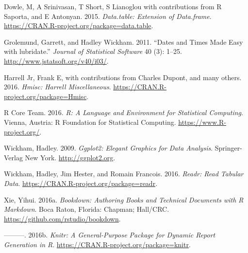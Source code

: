 \documentclass[]{article}
\theoremstyle{definition}
\theoremstyle{definition}
\theoremstyle{definition}
\theoremstyle{remark}
\begin{document}
\hypertarget{refs}{}
\hypertarget{ref-data.table}{}
Dowle, M, A Srinivasan, T Short, S Lianoglou with contributions from R
Saporta, and E Antonyan. 2015. \emph{Data.table: Extension of
Data.frame}. \url{https://CRAN.R-project.org/package=data.table}.

\hypertarget{ref-lubridate}{}
Grolemund, Garrett, and Hadley Wickham. 2011. ``Dates and Times Made
Easy with lubridate.'' \emph{Journal of Statistical Software} 40 (3):
1--25. \url{http://www.jstatsoft.org/v40/i03/}.

\hypertarget{ref-Hmisc}{}
Harrell Jr, Frank E, with contributions from Charles Dupont, and many
others. 2016. \emph{Hmisc: Harrell Miscellaneous}.
\url{https://CRAN.R-project.org/package=Hmisc}.

\hypertarget{ref-baseR}{}
R Core Team. 2016. \emph{R: A Language and Environment for Statistical
Computing}. Vienna, Austria: R Foundation for Statistical Computing.
\url{https://www.R-project.org/}.

\hypertarget{ref-ggplot2}{}
Wickham, Hadley. 2009. \emph{Ggplot2: Elegant Graphics for Data
Analysis}. Springer-Verlag New York. \url{http://ggplot2.org}.

\hypertarget{ref-readr}{}
Wickham, Hadley, Jim Hester, and Romain Francois. 2016. \emph{Readr:
Read Tabular Data}. \url{https://CRAN.R-project.org/package=readr}.

\hypertarget{ref-bookdown}{}
Xie, Yihui. 2016a. \emph{Bookdown: Authoring Books and Technical
Documents with R Markdown}. Boca Raton, Florida: Chapman; Hall/CRC.
\url{https://github.com/rstudio/bookdown}.

\hypertarget{ref-knitr}{}
---------. 2016b. \emph{Knitr: A General-Purpose Package for Dynamic
Report Generation in R}. \url{https://CRAN.R-project.org/package=knitr}.
\end{document}
